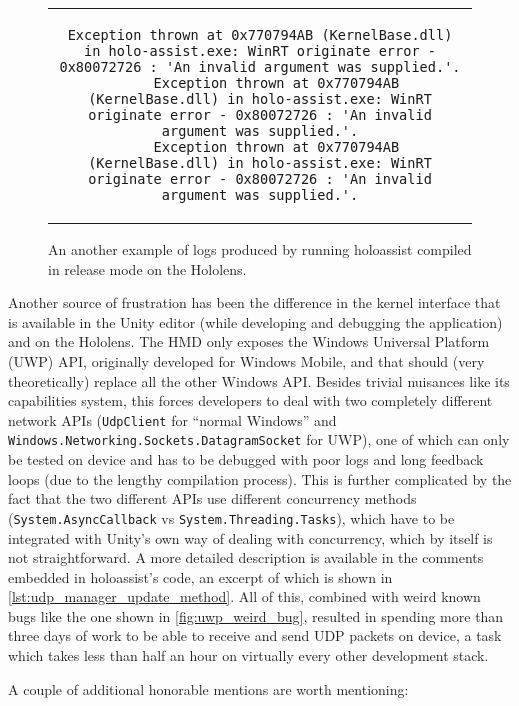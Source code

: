 \begin{figure}
  \centering
  \begin{tabular}{c}
  \begin{lstlisting}[]
    Exception thrown at 0x770794AB (KernelBase.dll) in holo-assist.exe: WinRT originate error - 0x80072726 : 'An invalid argument was supplied.'.
    Exception thrown at 0x770794AB (KernelBase.dll) in holo-assist.exe: WinRT originate error - 0x80072726 : 'An invalid argument was supplied.'.
    Exception thrown at 0x770794AB (KernelBase.dll) in holo-assist.exe: WinRT originate error - 0x80072726 : 'An invalid argument was supplied.'.
  \end{lstlisting}
  \end{tabular}
  \caption{An another example of logs produced by running \gls{holoassist} compiled in release mode on the Hololens.}\label{lst:log_ex_2}
\end{figure}

Another source of frustration has been the difference in the kernel interface that is available in the Unity editor (while developing and debugging the application) and on the Hololens. The \gls{HMD} only exposes the Windows Universal Platform (UWP) \gls{API}, originally developed for Windows Mobile, and that should (very theoretically) replace all the other Windows \gls{API}. Besides trivial nuisances like its capabilities system, this forces developers to deal with two completely different network \gls{API}s (\texttt{UdpClient} for \enquote{normal Windows} and \texttt{Windows.Networking.Sockets.DatagramSocket} for UWP), one of which can only be tested on device and has to be debugged with poor logs and long feedback loops (due to the lengthy compilation process). This is further complicated by the fact that the two different \gls{API}s use different concurrency methods (\texttt{System.AsyncCallback} vs \texttt{System.Threading.Tasks}), which have to be integrated with Unity's own way of dealing with concurrency, which by itself is not straightforward. A more detailed description is available in the comments embedded in \gls{holoassist}'s code, an excerpt of which is shown in \autoref{lst:udp_manager_update_method}. All of this, combined with weird known bugs like the one shown in \autoref{fig:uwp_weird_bug}, resulted in spending more than three days of work to be able to receive and send \gls{UDP} packets on device, a task which takes less than half an hour on virtually every other development stack.

A couple of additional honorable mentions are worth mentioning:

